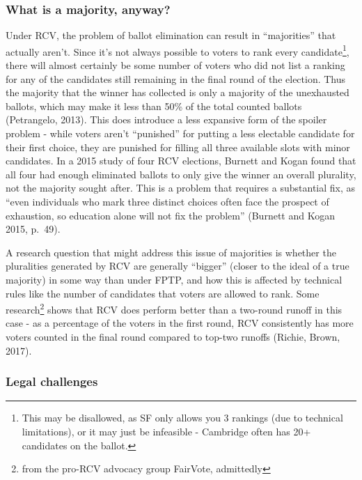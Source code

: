 \documentclass[12pt,twoside]{reedthesis}
\theoremstyle{definition}
\theoremstyle{definition}
\theoremstyle{definition}
\theoremstyle{remark}
\begin{document}
\hypertarget{what-is-a-majority-anyway}{%
\subsubsection{What is a majority,
anyway?}\label{what-is-a-majority-anyway}}

Under RCV, the problem of ballot elimination can result in
``majorities'' that actually aren't. Since it's not always possible to
voters to rank every candidate\footnote{This may be disallowed, as SF
  only allows you 3 rankings (due to technical limitations), or it may
  just be infeasible - Cambridge often has 20+ candidates on the ballot.},
there will almost certainly be some number of voters who did not list a
ranking for any of the candidates still remaining in the final round of
the election. Thus the majority that the winner has collected is only a
majority of the unexhausted ballots, which may make it less than 50\% of
the total counted ballots (Petrangelo, 2013). This does introduce a less
expansive form of the spoiler problem - while voters aren't ``punished''
for putting a less electable candidate for their first choice, they are
punished for filling all three available slots with minor candidates. In
a 2015 study of four RCV elections, Burnett and Kogan found that all
four had enough eliminated ballots to only give the winner an overall
plurality, not the majority sought after. This is a problem that
requires a substantial fix, as ``even individuals who mark three
distinct choices often face the prospect of exhaustion, so education
alone will not fix the problem'' (Burnett and Kogan 2015, p.~49).

A research question that might address this issue of majorities is
whether the pluralities generated by RCV are generally ``bigger''
(closer to the ideal of a true majority) in some way than under FPTP,
and how this is affected by technical rules like the number of
candidates that voters are allowed to rank. Some research\footnote{from
  the pro-RCV advocacy group FairVote, admittedly} shows that RCV does
perform better than a two-round runoff in this case - as a percentage of
the voters in the first round, RCV consistently has more voters counted
in the final round compared to top-two runoffs (Richie, Brown, 2017).

\hypertarget{legal-challenges}{%
\subsubsection{Legal challenges}\label{legal-challenges}}
\end{document}
